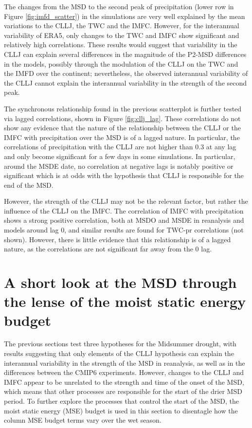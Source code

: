 The changes from the MSD to the second peak of precipitation (lower row in Figure \ref{fig:imfd_scatter}) in the simulations are very well explained by the mean variations to the CLLJ, the TWC and the IMFC. However, for the interannual variability of ERA5, only changes to the TWC and IMFC show significant and relatively high correlations. These results would suggest that variability in the CLLJ can explain several differences in the magnitude of the P2-MSD differences in the models, possibly through the modulation of the CLLJ on the TWC and the IMFD over the continent; nevertheless, the observed interannual variability of the CLLJ cannot explain the interannual variability in the strength of the second peak. %

The synchronous relationship found in the previous scatterplot is further tested via lagged correlations, shown in Figure \ref{fig:cllj_lag}. These correlations do not show any evidence that the nature of the relationship between the CLLJ or the IMFC with precipitation over the MSD is of a lagged nature. In particular, the correlations of precipitation with the CLLJ are not higher than 0.3 at any lag and only become significant for a few days in some simulations. In particular, around the MSDE date, no correlation at negative lags is notably positive or significant which is at odds with the hypothesis that CLLJ is responsible for the end of the MSD. 

However, the strength of the CLLJ may not be the relevant factor, but rather the influence of the CLLJ on the IMFC. The correlation of IMFC with precipitation shows a strong positive correlation, both at MSDO and MSDE in reanalysis and models around lag 0, and similar results are found for TWC-pr correlations (not shown). However, there is little evidence that this relationship is of a lagged nature, as the correlations are not significant far away from the 0 lag. 



\section{A short look at the MSD through the lense of the moist static energy budget}

The previous sections test three hypotheses for the Midsummer drought, with results suggesting that only elements of the CLLJ hypothesis can explain the interannual variability in the strength of the MSD in reanalysis, as well as in the differences between the CMIP6 experiments. However, changes to the CLLJ and IMFC appear to be unrelated to the strength and time of the onset of the MSD, which means that other processes are responsible for the start of the drier MSD period. 
To further explore the processes that control the start of the MSD, the moist static energy (MSE) budget is used in this section to disentagle how the column MSE budget terms vary over the wet season.

